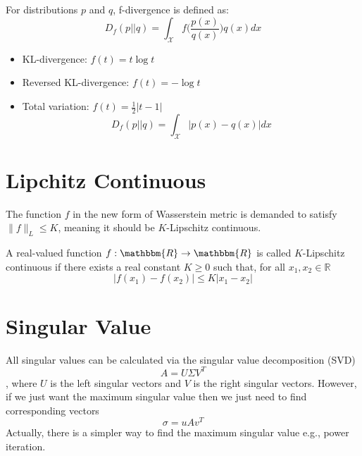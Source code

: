 \begin{appendices}
For distributions $p$ and $q$, f-divergence is defined as:
$$D_{f}(p||q) = \int_{\mathcal{X}}f\Bigg(\frac{p(x)}{q(x)}\Bigg)q(x)dx$$

\begin{itemize}
	\item KL-divergence: $f(t) = t\log t$
	\item Reversed KL-divergence: $f(t) = -\log t$
	\item Total variation: $f(t) = \frac{1}{2}|t-1|$
	$$D_{f}(p||q) = \int_{\mathcal{X}}|p(x)-q(x)|dx$$
\end{itemize}

\section{Lipchitz Continuous}
The function $f$ in the new form of Wasserstein metric is demanded to satisfy $\| f \|_L \leq K$, meaning it should be $K$-Lipschitz continuous. \citep{Lil2017}

A real-valued function $f: \mathbbm{R} \rightarrow \mathbbm{R}$ is called $K$-Lipschitz continuous if there exists a real constant $K\geq 0$ such that, for all $x_1, x_2 \in \mathbb{R}$
$$\lvert f(x_1) - f(x_2) \rvert \leq K \lvert x_1 - x_2 \rvert$$

\section{Singular Value}
All singular values can be calculated via the singular value decomposition (SVD)
$$A = U\Sigma V^T$$
, where $U$ is the left singular vectors and $V$ is the right singular vectors. However, if we just want the maximum singular value then we just need to find corresponding vectors
$$\sigma = uAv^T$$
Actually, there is a simpler way to find the maximum singular value e.g., power iteration. 



\end{appendices}
